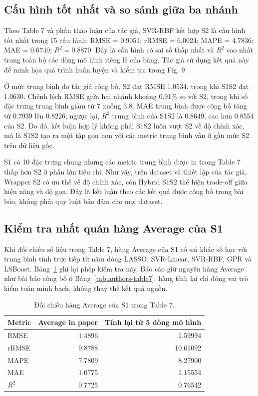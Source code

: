 \subsection{Cấu hình tốt nhất và so sánh giữa ba nhánh}

Theo Table 7 và phần thảo luận của tác giả, SVR-RBF kết hợp S2 là cấu hình tốt nhất trong 15 cấu hình: RMSE = 0.9051; rRMSE = 6.0024; MAPE = 4.7836; MAE = 0.6740; $R^2=0.8870$. Đây là cấu hình có sai số thấp nhất và $R^2$ cao nhất trong toàn bộ các dòng mô hình riêng lẻ của bảng. Tác giả sử dụng kết quả này để minh họa quá trình huấn luyện và kiểm tra trong Fig. 9.

Ở mức trung bình do tác giả công bố, S2 đạt RMSE 1.0534, trong khi S1S2 đạt 1.0630. Chênh lệch RMSE giữa hai nhánh khoảng 0.91\% so với S2, trong khi số đặc trưng trung bình giảm từ 7 xuống 3.8. MAE trung bình được công bố tăng từ 0.7939 lên 0.8226; ngược lại, $R^2$ trung bình của S1S2 là 0.8649, cao hơn 0.8554 của S2. Do đó, kết luận hợp lý không phải S1S2 luôn vượt S2 về độ chính xác, mà là S1S2 tạo ra một tập gọn hơn với các metric trung bình vẫn ở gần mức S2 trên dữ liệu gốc.

S1 có 10 đặc trưng chung nhưng các metric trung bình được in trong Table 7 thấp hơn S2 ở phần lớn tiêu chí. Như vậy, trên dataset và thiết lập của tác giả, Wrapper S2 có ưu thế về độ chính xác, còn Hybrid S1S2 thể hiện trade-off giữa hiệu năng và độ gọn. Đây là kết luận theo các kết quả được công bố trong bài báo, không phải quy luật bảo đảm cho mọi dataset.

\subsection{Kiểm tra nhất quán hàng Average của S1}

Khi đối chiếu số liệu trong Table 7, hàng Average của S1 có sai khác số học với trung bình tính trực tiếp từ năm dòng LASSO, SVR-Linear, SVR-RBF, GPR và LSBoost. Bảng~\ref{tab:authors-s1-average-audit} ghi lại phép kiểm tra này. Báo cáo giữ nguyên hàng Average như bài báo công bố ở Bảng~\ref{tab:authors-table7}; hàng tính lại chỉ đóng vai trò kiểm toán minh bạch, không thay thế kết quả nguồn.

\begin{table}[H]
\centering
\small
\caption{Đối chiếu hàng Average của S1 trong Table 7.}
\label{tab:authors-s1-average-audit}
\begin{tabular}{lrr}
\toprule
\textbf{Metric} & \textbf{Average in paper} & \textbf{Tính lại từ 5 dòng mô hình} \\
\midrule
RMSE & 1.4896 & 1.59994 \\
rRMSE & 9.8788 & 10.61092 \\
MAPE & 7.7809 & 8.27900 \\
MAE & 1.0775 & 1.15554 \\
$R^2$ & 0.7725 & 0.76542 \\
\bottomrule
\end{tabular}
\end{table}

